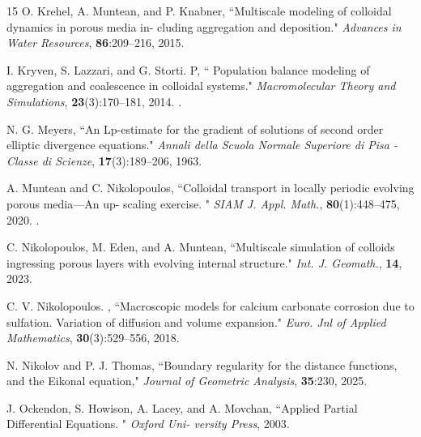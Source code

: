 \documentclass[reqno, 11pt]{amsart}
\numberwithin{equation}{section}
\begin{document}
\begin{thebibliography}{15}
\newblock  O. Krehel, A. Muntean, and P. Knabner,
\newblock  ``Multiscale modeling of colloidal dynamics in porous media in-
cluding aggregation and deposition."
\newblock   \emph{Advances in Water Resources},  \textbf{86}:209–216, 2015.

\newblock I. Kryven, S. Lazzari, and G. Storti. P,
\newblock  `` Population balance modeling of aggregation and coalescence in colloidal
systems."
\newblock   \emph{Macromolecular Theory and Simulations},  \textbf{23}(3):170–181, 2014. .

\newblock  N. G. Meyers,
\newblock  ``An Lp-estimate for the gradient of solutions of second order elliptic divergence equations."
\newblock   \emph{Annali della Scuola Normale Superiore di Pisa - Classe di Scienze},  \textbf{17}(3):189–206, 1963.

\newblock A. Muntean and C. Nikolopoulos,
\newblock  ``Colloidal transport in locally periodic evolving porous media—An up-
scaling exercise. "
\newblock   \emph{SIAM J. Appl. Math.},  \textbf{80}(1):448–475, 2020. .

\newblock  C. Nikolopoulos, M. Eden, and A. Muntean,
\newblock  ``Multiscale simulation of colloids ingressing porous layers with
evolving internal structure."
\newblock   \emph{Int. J. Geomath.},  \textbf{14}, 2023.


\newblock  C. V. Nikolopoulos. ,
\newblock  ``Macroscopic models for calcium carbonate corrosion due to sulfation. Variation of
diffusion and volume expansion."
\newblock   \emph{Euro. Jnl of Applied Mathematics},  \textbf{30}(3):529–556, 2018.

\newblock  N. Nikolov and P. J. Thomas,
\newblock ``Boundary regularity for the distance functions, and the Eikonal equation,"
\newblock   \emph{Journal of Geometric Analysis},  \textbf{35}:230, 2025.

\newblock  J. Ockendon, S. Howison, A. Lacey, and A. Movchan,
\newblock  ``Applied Partial Differential Equations. "
\newblock   \emph{Oxford Uni-
versity Press}, 2003. \textbf{} 


\end{thebibliography}
\end{document}
